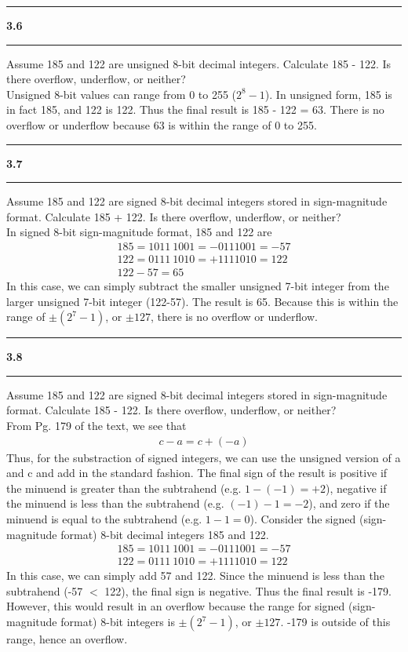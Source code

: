 \documentclass[11pt]{article}
\newcommand\question[2]{\vspace{.25in}\hrule\textbf{#1 #2}\vspace{.5em}\hrule\vspace{.10in}}
\begin{document}
\question{3.6}{} 
Assume 185 and 122 are unsigned 8-bit decimal integers. Calculate 185 - 122. Is there overflow, underflow, or neither?\\[1em]

Unsigned 8-bit values can range from 0 to 255 ($2^8 - 1$). In unsigned form, 185 is in fact 185, and 122 is 122. Thus the final result is 185 - 122 = 63. There is no overflow or underflow because 63 is within the range of 0 to 255.

\question{3.7}{} 
Assume 185 and 122 are signed 8-bit decimal integers stored in sign-magnitude format. Calculate  185 + 122.  Is there overflow, underflow, or neither?\\[1em]

In signed 8-bit sign-magnitude format, 185 and 122 are
\begin{gather*}
185 = 1011 \: 1001 = -0111001 = -57 \\
122 = 0111 \: 1010 = +1111010 = 122 \\
122-57 = 65
\end{gather*}
In this case, we can simply subtract the smaller unsigned 7-bit integer from the larger unsigned 7-bit integer (122-57). The result is 65. Because this is within the range of $\pm (2^{7} - 1)$, or $\pm 127$, there is no overflow or underflow.

\question{3.8}{} 
Assume 185 and 122 are signed 8-bit decimal integers stored in sign-magnitude format. Calculate 185 - 122. Is there overflow, underflow, or neither?\\[1em]

From Pg. 179 of the text, we see that 
\begin{gather*}
c - a = c + (-a)
\end{gather*}
Thus, for the substraction of signed integers, we can use the unsigned version of a and c and add in the standard fashion. The final sign of the result is positive if the minuend is greater than the subtrahend (e.g. $1-(-1)=+2$), negative if the minuend is less than the subtrahend (e.g. $(-1)-1=-2$), and zero if the minuend is equal to the subtrahend (e.g. $1-1=0$). Consider the signed (sign-magnitude format) 8-bit decimal integers 185 and 122.
\begin{gather*}
185 = 1011 \: 1001 = -0111001 = -57 \\
122 = 0111 \: 1010 = +1111010 = 122 
\end{gather*}
In this case, we can simply add 57 and 122. Since the minuend is less than the subtrahend (-57 $<$ 122), the final sign is negative. Thus the final result is -179. However, this would result in an overflow because the range for signed (sign-magnitude format) 8-bit integers is $\pm (2^{7} - 1)$, or $\pm 127$. -179 is outside of this range, hence an overflow.
\end{document}
